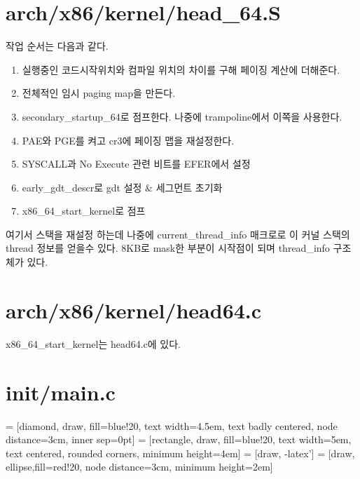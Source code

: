 \documentclass[a4paper,11pt]{report}
\begin{document}
\begin{CJK}{UTF8}{}
\section{arch/x86/kernel/head\_64.S}
작업 순서는 다음과 같다.
\begin{enumerate}
\item 실행중인 코드시작위치와 컴파일 위치의 차이를 구해 페이징 계산에 더해준다.
\item 전체적인 임시 paging map을 만든다.
\item secondary\_startup\_64로 점프한다. 나중에 trampoline에서 이쪽을 사용한다.
\item PAE와 PGE를 켜고 cr3에 페이징 맵을 재설정한다.
\item SYSCALL과 No Execute 관련 비트를 EFER에서 설정
\item early\_gdt\_descr로 gdt 설정 & 세그먼트 초기화
\item x86\_64\_start\_kernel로 점프
\end{enumerate}

여기서 스택을 재설정 하는데 나중에 current\_thread\_info 매크로로 이 커널 스택의 thread 정보를 얻을수 있다.
8KB로 mask한 부분이 시작점이 되며 thread_info 구조체가 있다.

\section{arch/x86/kernel/head64.c}
x86\_64\_start\_kernel는 head64.c에 있다.
\section{init/main.c}



 = [diamond, draw, fill=blue!20, 
    text width=4.5em, text badly centered, node distance=3cm, inner sep=0pt]
 = [rectangle, draw, fill=blue!20, 
    text width=5em, text centered, rounded corners, minimum height=4em]
 = [draw, -latex']
 = [draw, ellipse,fill=red!20, node distance=3cm,
    minimum height=2em]




\end{CJK}
\end{document}
